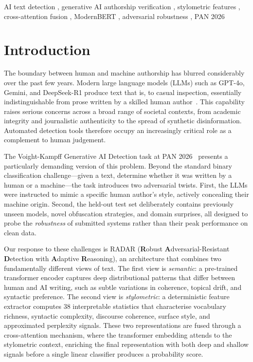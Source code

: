 \documentclass[]{ceurart}
\begin{document}
\begin{keywords}
  AI text detection \sep
  generative AI authorship verification \sep
  stylometric features \sep
  cross-attention fusion \sep
  ModernBERT \sep
  adversarial robustness \sep
  PAN 2026
\end{keywords}

\maketitle

\section{Introduction}

The boundary between human and machine authorship has blurred considerably over the past few years. Modern large language models (LLMs) such as GPT-4o, Gemini, and DeepSeek-R1 produce text that is, to casual inspection, essentially indistinguishable from prose written by a skilled human author~\cite{jakesch:2023}. This capability raises serious concerns across a broad range of societal contexts, from academic integrity and journalistic authenticity to the spread of synthetic disinformation. Automated detection tools therefore occupy an increasingly critical role as a complement to human judgement.

The Voight-Kampff Generative AI Detection task at PAN 2026~\cite{bevendorff:2025} presents a particularly demanding version of this problem. Beyond the standard binary classification challenge—given a text, determine whether it was written by a human or a machine—the task introduces two adversarial twists. First, the LLMs were instructed to mimic a specific human author's style, actively concealing their machine origin. Second, the held-out test set deliberately contains previously unseen models, novel obfuscation strategies, and domain surprises, all designed to probe the \emph{robustness} of submitted systems rather than their peak performance on clean data.

Our response to these challenges is RADAR (\textbf{R}obust \textbf{A}dversarial-Resistant \textbf{D}etection with \textbf{A}daptive \textbf{R}easoning), an architecture that combines two fundamentally different views of text. The first view is \emph{semantic}: a pre-trained transformer encoder captures deep distributional patterns that differ between human and AI writing, such as subtle variations in coherence, topical drift, and syntactic preference. The second view is \emph{stylometric}: a deterministic feature extractor computes 38 interpretable statistics that characterise vocabulary richness, syntactic complexity, discourse coherence, surface style, and approximated perplexity signals. These two representations are fused through a cross-attention mechanism, where the transformer embedding attends to the stylometric context, enriching the final representation with both deep and shallow signals before a single linear classifier produces a probability score.
\end{document}
